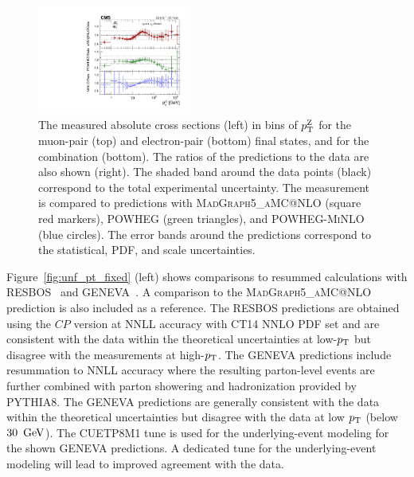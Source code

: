 \begin{figure}
	\includegraphics[width=0.45\textwidth]{figures/zpt/zll_shower_ratio.pdf}
	\caption{The measured absolute cross sections (left) in bins of $p_{\mathrm{T}}^{\mathrm{Z}}$ for the muon-pair (top) and electron-pair (bottom) final states, and for the combination (bottom). The ratios of the predictions to the data are also shown (right). The shaded band around the data points (black) correspond to the total experimental uncertainty. The measurement is compared to predictions with \textsc{MadGraph5\_aMC@NLO} (square red markers), \textsc{POWHEG} (green triangles), and \textsc{POWHEG-MiNLO} (blue circles). The error bands around the predictions correspond to the statistical, PDF, and scale uncertainties.}
	\label{fig:unf_pt_shower}
\end{figure}

Figure~\ref{fig:unf_pt_fixed} (left) shows comparisons to resummed calculations 
with \textsc{RESBOS}~\cite{Ladinsky:1993zn, Balazs:1997xd, Landry:2002ix} 
and GENEVA~\cite{Alioli:2015toa}. A comparison to 
the \textsc{MadGraph5\_aMC@NLO} prediction is also included as a reference. 
The \textsc{RESBOS} predictions are obtained using the $CP$ version at 
NNLL accuracy with CT14 NNLO PDF set and are consistent with the data within 
the theoretical uncertainties at low-$p_{\mathrm{T}}$ but disagree with the measurements 
at high-$p_{\mathrm{T}}$. The GENEVA predictions include resummation to NNLL accuracy 
where the resulting parton-level events are further combined with parton 
showering and hadronization provided by \textsc{PYTHIA8}. The GENEVA 
predictions are generally consistent with the data within the theoretical 
uncertainties but disagree with the data at low $p_{\mathrm{T}}$ (below $30~\,\text{Ge\hspace{-.08em}V}$). 
The CUETP8M1 tune is used for the underlying-event modeling for the shown 
GENEVA predictions. A dedicated tune for the underlying-event modeling will 
lead to improved agreement with the data.  

